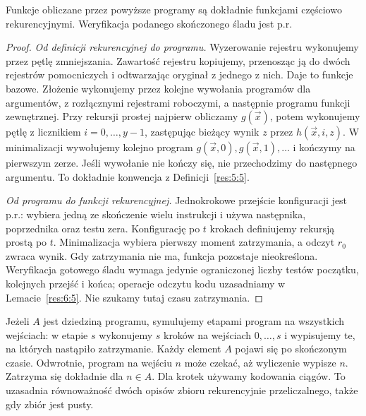 \begin{lemat}\label{res:6:3}
Funkcje obliczane przez powyższe programy są dokładnie funkcjami częściowo rekurencyjnymi. Weryfikacja podanego skończonego śladu jest p.r.
\end{lemat}
\begin{proof}
\emph{Od definicji rekurencyjnej do programu.} Wyzerowanie rejestru wykonujemy przez pętlę zmniejszania. Zawartość rejestru kopiujemy, przenosząc ją do dwóch rejestrów pomocniczych i odtwarzając oryginał z jednego z nich. Daje to funkcje bazowe. Złożenie wykonujemy przez kolejne wywołania programów dla argumentów, z rozłącznymi rejestrami roboczymi, a następnie programu funkcji zewnętrznej. Przy rekursji prostej najpierw obliczamy $g(\vec x)$, potem wykonujemy pętlę z licznikiem $i=0,\ldots,y-1$, zastępując bieżący wynik $z$ przez $h(\vec x,i,z)$. W minimalizacji wywołujemy kolejno program $g(\vec x,0),g(\vec x,1),\ldots$ i kończymy na pierwszym zerze. Jeśli wywołanie nie kończy się, nie przechodzimy do następnego argumentu. To dokładnie konwencja z Definicji~\ref{res:5:5}.

\emph{Od programu do funkcji rekurencyjnej.} Jednokrokowe przejście konfiguracji jest p.r.: wybiera jedną ze skończenie wielu instrukcji i używa następnika, poprzednika oraz testu zera. Konfigurację po $t$ krokach definiujemy rekursją prostą po $t$. Minimalizacja wybiera pierwszy moment zatrzymania, a odczyt $r_0$ zwraca wynik. Gdy zatrzymania nie ma, funkcja pozostaje nieokreślona. Weryfikacja gotowego śladu wymaga jedynie ograniczonej liczby testów początku, kolejnych przejść i końca; operacje odczytu kodu uzasadniamy w Lemacie~\ref{res:6:5}. Nie szukamy tutaj czasu zatrzymania.
\end{proof}

\begin{uwaga}\label{res:6:4}
Jeżeli $A$ jest dziedziną programu, symulujemy etapami program na wszystkich wejściach: w etapie $s$ wykonujemy $s$ kroków na wejściach $0,\ldots,s$ i wypisujemy te, na których nastąpiło zatrzymanie. Każdy element $A$ pojawi się po skończonym czasie. Odwrotnie, program na wejściu $n$ może czekać, aż wyliczenie wypisze $n$. Zatrzyma się dokładnie dla $n\in A$. Dla krotek używamy kodowania ciągów. To uzasadnia równoważność dwóch opisów zbioru rekurencyjnie przeliczalnego, także gdy zbiór jest pusty.
\end{uwaga}

